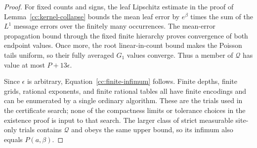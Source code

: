 \begin{proof}
For fixed counts and signs, the leaf Lipschitz estimate in the proof
of Lemma~\ref{cc:kernel-collapse} bounds the mean leaf error by
$e^\beta$ times the sum of the $L^1$ message errors over the finitely
many occurrences.  The mean-error propagation bound through the
fixed finite hierarchy proves convergence of both endpoint values.
Once more, the root linear-in-count bound makes the Poisson tails
uniform, so their fully averaged $G_1$ values converge.  Thus a member
of $\mathcal Q$ has value at most $P+13\epsilon$.

Since $\epsilon$ is arbitrary, Equation~\eqref{cc:finite-infimum}
follows.  Finite depths, finite grids, rational exponents, and finite
rational tables all have finite encodings and can be enumerated by a
single ordinary algorithm.  These are the trials used in the
certificate search; none of the compactness limits or tolerance
choices in the existence proof is input to that search.  The larger class of strict measurable site-only trials contains
$\mathcal Q$ and obeys the same upper bound, so its infimum also equals
$P(a,\beta)$.
\end{proof}
